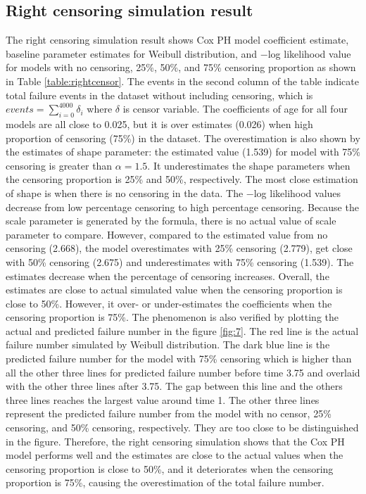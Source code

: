 \subsection{Right censoring simulation result}
The right censoring simulation result shows Cox PH model coefficient estimate, baseline parameter estimates for Weibull distribution, and $-$log likelihood value for models with no censoring, 25\%, 50\%, and 75\% censoring proportion as shown in Table \ref{table:rightcensor}. The events in the second column of the table indicate total failure events in the dataset without including censoring, which is $events=\sum_{i=0}^{4000}{\delta_i}$ where $\delta$ is censor variable. The coefficients of age for all four models are all close to 0.025, but it is over estimates (0.026) when high proportion of censoring (75\%) in the dataset. The overestimation is also shown by the estimates of shape parameter: the estimated value (1.539) for model with 75\% censoring is greater than $\alpha=1.5$. It underestimates the shape parameters when the censoring proportion is 25\% and 50\%, respectively. The most close estimation of shape is when there is no censoring in the data. The $-$log likelihood values decrease from low percentage censoring to high percentage censoring. Because the scale parameter is generated by the formula, there is no actual value of scale parameter to compare. However, compared to the estimated value from no censoring (2.668), the model overestimates with 25\% censoring (2.779), get close with 50\% censoring (2.675) and underestimates with 75\% censoring (1.539). The estimates decrease when the percentage of censoring increases. Overall, the estimates are close to actual simulated value when the censoring proportion is close to 50\%. However, it over- or under-estimates the coefficients when the censoring proportion is 75\%. The phenomenon is also verified by plotting the actual and predicted failure number in the figure \ref{fig:7}.  The red line is the actual failure number simulated by Weibull distribution. The dark blue line is the predicted failure number for the model with 75\% censoring which is higher than all the other three lines for predicted failure number before time 3.75 and overlaid with the other three lines after 3.75. The gap between this line and the others three lines reaches the largest value around time 1. The other three lines represent the predicted failure number from the model with no censor, 25\% censoring, and 50\% censoring, respectively. They are too close to be distinguished in the figure. Therefore, the right censoring simulation shows that the Cox PH model performs well and the estimates are close to the actual values when the censoring proportion is close to 50\%, and it deteriorates when the censoring proportion is 75\%, causing the overestimation of the total failure number.
